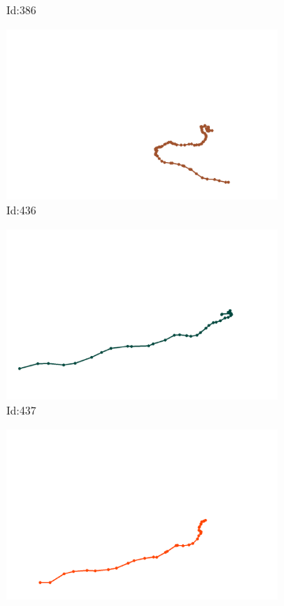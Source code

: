 \documentclass[12pt,twoside]{report}
\begin{document}
\begin{figure}
\begin{subfigure}[b]{0.20\textwidth}
\caption{Id:386}
\end{subfigure}
\begin{subfigure}[b]{0.20\textwidth}
\centering
\includegraphics[width=\textwidth]{../../trajectories/436.png}
\caption{Id:436}
\end{subfigure}
\begin{subfigure}[b]{0.20\textwidth}
\centering
\includegraphics[width=\textwidth]{../../trajectories/437.png}
\caption{Id:437}
\end{subfigure}
\begin{subfigure}[b]{0.20\textwidth}
\centering
\includegraphics[width=\textwidth]{../../trajectories/468.png}

\end{subfigure}
\end{figure}
\end{document}
